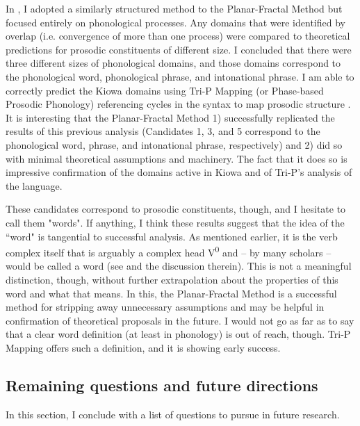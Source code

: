 \documentclass[output=paper]{langscibook}
\begin{document}
In \citealt{Miller:2018}, I adopted a similarly structured method to the Planar-Fractal Method but focused entirely on phonological processes. Any domains that were identified by overlap (i.e. convergence of more than one process) were compared to theoretical predictions for prosodic constituents of different size. I concluded that there were three different sizes of phonological domains, and those domains correspond to the phonological word, phonological phrase, and intonational phrase. I am able to correctly predict the Kiowa domains using Tri-P Mapping (or Phase-based Prosodic Phonology) referencing cycles in the syntax to map prosodic structure \citep[][]{Miller:2018,Miller:2020,miller:2021}. It is interesting that the Planar-Fractal Method 1) successfully replicated the results of this previous analysis (Candidates 1, 3, and 5 correspond to the phonological word, phrase, and intonational phrase, respectively) and 2) did so with minimal theoretical assumptions and machinery. The fact that it does so is impressive confirmation of the domains active in Kiowa and of Tri-P's analysis of the language. 

These candidates correspond to prosodic constituents, though, and I hesitate to call them "words". If anything, I think these results suggest that the idea of the ``word" is tangential to successful analysis. As mentioned earlier, it is the verb complex itself that is arguably a complex head V\textsuperscript{0} and -- by many scholars -- would be called a word (see \citealt{selkirk:2011} and the discussion therein). This is not a meaningful distinction, though, without further extrapolation about the properties of this word and what that means. In this, the Planar-Fractal Method is a successful method for stripping away unnecessary assumptions and may be helpful in confirmation of theoretical proposals in the future. I would not go as far as \citet{bickel:2017} to say that a clear word definition (at least in phonology) is out of reach, though. Tri-P Mapping offers such a definition, and it is showing early success.

\subsection{Remaining questions and future directions}

In this section, I conclude with a list of questions to pursue in future research.
\end{document}
